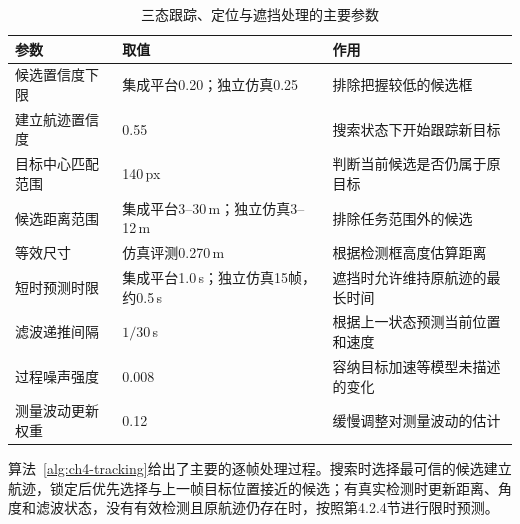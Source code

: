 \begin{table}[htbp]
\centering
\caption{三态跟踪、定位与遮挡处理的主要参数}
\label{tab:ch4-params}
\small
\begin{tabularx}{\textwidth}{P{3.5cm} L{5.0cm} Z}
\toprule
参数 & 取值 & 作用 \\
\midrule
候选置信度下限 & 集成平台0.20；独立仿真0.25 & 排除把握较低的候选框 \\
建立航迹置信度 & 0.55 & 搜索状态下开始跟踪新目标 \\
目标中心匹配范围 & 140\,px & 判断当前候选是否仍属于原目标 \\
候选距离范围 & 集成平台3--30\,m；独立仿真3--12\,m & 排除任务范围外的候选 \\
等效尺寸 & 仿真评测0.270\,m & 根据检测框高度估算距离 \\
短时预测时限 & 集成平台1.0\,s；独立仿真15帧，约0.5\,s & 遮挡时允许维持原航迹的最长时间 \\
滤波递推间隔 & $1/30$\,s & 根据上一状态预测当前位置和速度 \\
过程噪声强度 & 0.008 & 容纳目标加速等模型未描述的变化 \\
测量波动更新权重 & 0.12 & 缓慢调整对测量波动的估计 \\
\bottomrule
\end{tabularx}
\end{table}

算法~\ref{alg:ch4-tracking}给出了主要的逐帧处理过程。搜索时选择最可信的候选建立航迹，锁定后优先选择与上一帧目标位置接近的候选；有真实检测时更新距离、角度和滤波状态，没有有效检测且原航迹仍存在时，按照第4.2.4节进行限时预测。

